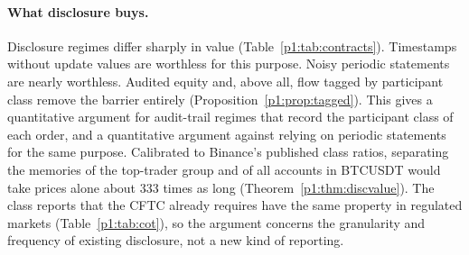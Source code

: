\paragraph{What disclosure buys.} Disclosure regimes differ sharply in value (Table~\ref{p1:tab:contracts}). Timestamps without update values are worthless for this purpose. Noisy periodic statements are nearly worthless. Audited equity and, above all, flow tagged by participant class remove the barrier entirely (Proposition~\ref{p1:prop:tagged}). This gives a quantitative argument for audit-trail regimes that record the participant class of each order, and a quantitative argument against relying on periodic statements for the same purpose. Calibrated to Binance's published class ratios, separating the memories of the top-trader group and of all accounts in BTCUSDT would take prices alone about 333 times as long (Theorem~\ref{p1:thm:discvalue}). The class reports that the CFTC already requires have the same property in regulated markets (Table~\ref{p1:tab:cot}), so the argument concerns the granularity and frequency of existing disclosure, not a new kind of reporting.

